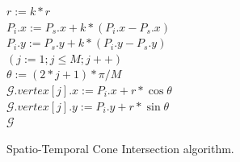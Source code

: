 \begin{figure}[tb!]
\begin{center}
{\begin{minipage}{3.36in}
{	\icc \hspace{1ex} $r := k*r$  \\
	\icc \hspace{1ex} $P_i.x := P_s.x + k*(P_i.x-P_s.x)$ \\
	\icc \hspace{1ex} $P_i.y := P_s.y + k*(P_i.y-P_s.y)$ \\
	\icc \hspace{1ex} \For $(j := 1;j \le M;j++)$ \\
	\icc \> \hspace{3ex} $\theta :=  (2 * j + 1)*\pi /M $ \\
	\icc \> \hspace{3ex} $\mathcal{G}.vertex[j].x := P_i.x + r*\cos\theta$\\
	\icc \> \hspace{3ex} $\mathcal{G}.vertex[j].y := P_i.y + r*\sin\theta$\\
	\icc \hspace{1ex} \Return $\mathcal{G}$
}
\vspace{-2ex}
\myhrule
\end{minipage}
}
\end{center}
\vspace{-2ex}
\caption{\small Spatio-Temporal Cone Intersection algorithm.}
\label{alg:CI3d}
\vspace{-2ex}
\end{figure}






